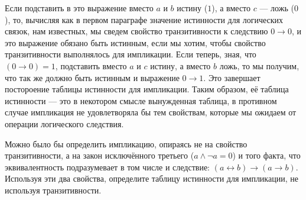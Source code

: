 Если подставить в это выражение вместо $a$ и $b$ истину ($1$), а вместо $c$ --- ложь ($0$), то, вычисляя как в первом параграфе значение истинности для логических связок, нам известных, мы сведем свойство транзитивности к следствию $0 \to 0$, и это выражение обязано быть истинным, если мы хотим, чтобы свойство транзитивности выполнялось для импликации. Если теперь, зная, что $(0 \to 0) = 1$, подставить вместо $a$ и $c$ истину, а вместо $b$ ложь, то мы получим, что так же должно быть истинным и выражение $0 \to 1$. Это завершает постороение таблицы истинности для импликации. Таким образом, её таблица истинности --- это в некотором смысле вынужденная таблица, в противном случае импликация не удовлетворяла бы тем свойствам, которые мы ожидаем от операции логического следствия.

\begin{exercise}Можно было бы определить импликацию, опираясь не на свойство транзитивности, а на закон исключённого третьего ($a \land \neg a = 0$) и того факта, что эквивалентность подразумевает в том числе и следствие: $(a \leftrightarrow b) \to (a \to b)$. Используя эти два свойства, определите таблицу истинности для импликации, не используя транзитивности.\end{exercise}